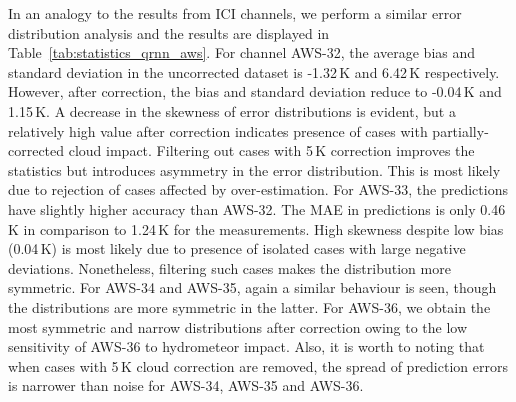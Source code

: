 \documentclass[amt, manuscript]{copernicus}
\begin{document}
In an analogy to the results from ICI channels, we perform a similar error distribution analysis  and the results are displayed in Table~\ref{tab:statistics_qrnn_aws}. For channel AWS-32, the average bias and standard deviation in the uncorrected dataset is -1.32\,K and 6.42\,K respectively. However, after correction, the bias and standard deviation reduce to -0.04\,K and 1.15\,K. A decrease in the skewness of error distributions is evident, but a relatively high value after correction indicates presence of cases with partially-corrected cloud impact. Filtering out cases with 5\,K correction improves the statistics but introduces asymmetry in the error distribution. This is most likely due to rejection of cases affected by over-estimation. For AWS-33, the predictions have slightly higher accuracy than AWS-32. The MAE in predictions is only 0.46\,K in comparison to 1.24\,K for the measurements. High skewness despite low bias (0.04\,K) is most likely due to presence of isolated cases with large negative deviations. Nonetheless, filtering such cases makes the distribution more symmetric. For AWS-34 and AWS-35, again a similar behaviour is seen, though the distributions are more symmetric in the latter. For AWS-36, we obtain the most symmetric and narrow distributions after correction owing to the low sensitivity of AWS-36 to hydrometeor impact.  Also, it is worth to noting that when cases with 5\,K cloud correction are removed, the spread of prediction errors is narrower than noise for AWS-34, AWS-35 and AWS-36. 
\end{document}
